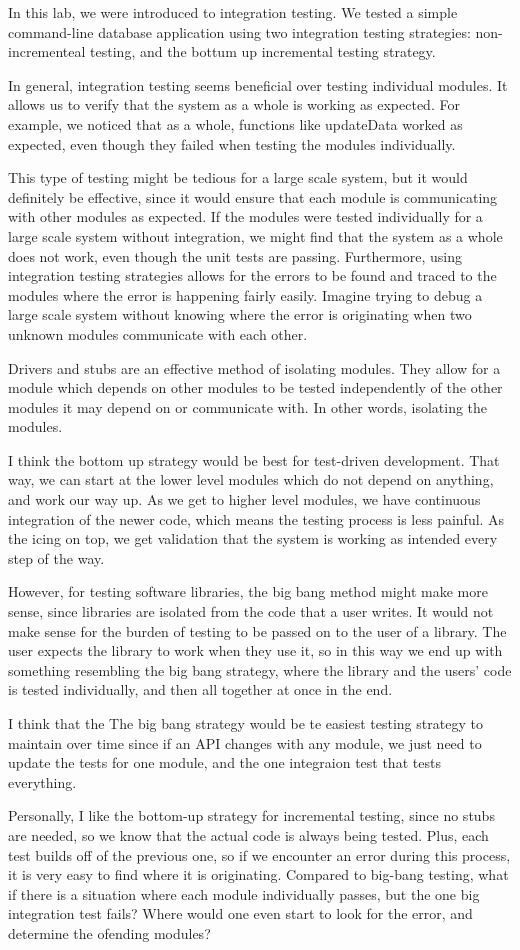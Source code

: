 In this lab, we were introduced to integration testing.  We tested a simple
command-line database application using two integration testing strategies:
non-incrementeal testing, and the bottum up incremental testing strategy.

In general, integration testing seems beneficial over testing individual
modules. It allows us to verify that the system as a whole is working as
expected. For example, we noticed that as a whole, functions like updateData
worked as expected, even though they failed when testing the modules
individually. 

This type of testing might be tedious for a large scale system, but it would
definitely be effective, since it would ensure that each module is communicating
with other modules as expected. If the modules were tested individually for a
large scale system without integration, we might find that the system as a whole
does not work, even though the unit tests are passing. Furthermore, using
integration testing strategies allows for the errors to be found and traced to
the modules where the error is happening fairly easily. Imagine trying to debug
a large scale system without knowing where the error is originating when two
unknown modules communicate with each other.

Drivers and stubs are an effective
method of isolating modules. They allow for a module which depends on other
modules to be tested independently of the other modules it may depend on or
communicate with. In other words, isolating the modules.

I think the bottom up strategy would be best for
test-driven development. That way, we can start at the lower level modules which
do not depend on anything, and work our way up. As we get to higher level
modules, we have continuous integration of the newer code, which means the
testing process is less painful. As the icing on top, we get validation that
the system is working as intended every step of the way.

However, for testing software libraries, the
big bang method might make more sense, since libraries are isolated from the
code that a user writes. It would not make sense for the burden of testing to be
passed on to the user of a library. The user expects the library to work when
they use it, so in this way we end up with something resembling the big bang
strategy, where the library and the users' code is tested individually, and then
all together at once in the end. 

I think that the The big bang strategy would be
te easiest testing strategy to maintain over time since if an API changes with
any module, we just need to update the tests for one module, and the one
integraion test that tests everything. 

Personally, I like the bottom-up
strategy for incremental testing, since no stubs are needed, so we know that the
actual code is always being tested. Plus, each test builds off of the previous
one, so if we encounter an error during this process, it is very easy to find
where it is originating. Compared to big-bang testing, what if there is a
situation where each module individually passes, but the one big integration
test fails? Where would one even start to look for the error, and determine the
ofending modules?
